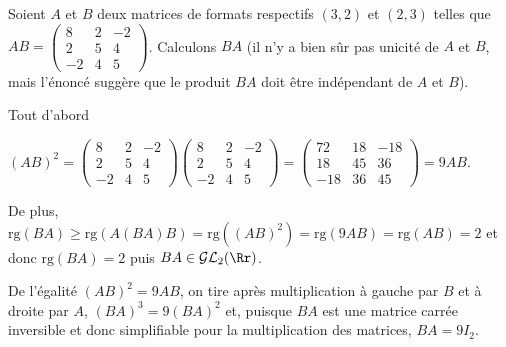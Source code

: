 {{Soient $A$ et $B$ deux matrices de formats respectifs $(3,2)$ et $(2,3)$ telles que $AB=\left(
\begin{array}{ccc}
8&2&-2\\
2&5&4\\
-2&4&5
\end{array}
\right)$. Calculons $BA$ (il n'y a bien sûr pas unicité de $A$ et $B$, mais l'énoncé suggère que le produit $BA$ doit être indépendant de $A$ et $B$).

Tout d'abord 

\begin{center}
$(AB)^2=\left(
\begin{array}{ccc}
8&2&-2\\
2&5&4\\
-2&4&5
\end{array}
\right)\left(
\begin{array}{ccc}
8&2&-2\\
2&5&4\\
-2&4&5
\end{array}
\right)=\left(
\begin{array}{ccc}
72&18&-18\\
18&45&36\\
-18&36&45
\end{array}
\right)=9AB$.
\end{center}

De plus, $\text{rg}(BA)\geqslant\text{rg}(A(BA)B)=\text{rg}((AB)^2)=\text{rg}(9AB) =\text{rg}(AB)=2$ et donc $\text{rg}(BA)=2$ puis $BA\in\mathcal{GL}_2(\Rr)$.

De l'égalité $(AB)^2=9AB$, on tire après multiplication à gauche par $B$ et à droite par $A$, $(BA)^3=9(BA)^2$ et, puisque $BA$ est une matrice carrée inversible et donc simplifiable pour la multiplication des matrices, $BA=9I_2$.

\begin{center}
\end{center}}
}